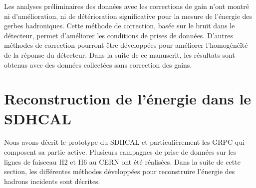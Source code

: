 Les analyses préliminaires des données avec les corrections de gain n'ont montré ni d'amélioration, ni de détérioration significative pour la mesure de l'énergie des gerbes hadroniques. Cette méthode de correction, basée sur le bruit dans le détecteur, permet d'améliorer les conditions de prises de données. D'autres méthodes de correction pourront être développées pour améliorer l'homogénéïté de la réponse du détecteur. Dans la suite de ce manuscrit, les résultats sont obtenus avec des données collectées sans correction des gains.


\section{Reconstruction de l'énergie dans le SDHCAL}
Nous avons décrit le prototype du SDHCAL et particulièrement les GRPC qui composent sa partie active. Plusieurs campagnes de prise de données sur les lignes de faisceau H2 et H6 au CERN ont été réalisées. Dans la suite de cette section, les différentes méthodes développées pour reconstruire l'énergie des hadrons incidents sont décrites. 
